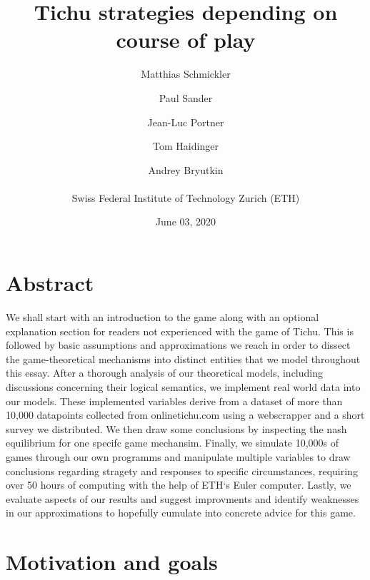 


\usepackage{multirow}
\usepackage{listings}
\usepackage{commath}
\usepackage{subcaption}
\usepackage{float}



\title{Tichu strategies depending on course of play}
\date{June 03, 2020}
\author{Matthias Schmickler \and Paul Sander \and Jean-Luc Portner \and Tom Haidinger \and Andrey Bryutkin \\ \\ Swiss Federal Institute of Technology Zurich (ETH)}
\maketitle

\section*{Abstract}
We shall start with an introduction to the game along with an optional explanation section for readers not experienced with the game of Tichu. This is followed by basic assumptions and approximations we reach in order to dissect the game-theoretical mechanisms into distinct entities that we model throughout this essay. After a thorough analysis of our theoretical models, including discussions concerning their logical semantics, we implement real world data into our models. These implemented variables derive from a dataset of more than 10,000 datapoints collected from onlinetichu.com using a webscrapper and a short survey we distributed. We then draw some conclusions by inspecting the nash equilibrium for one specifc game mechansim. Finally, we simulate 10,000s of games through our own programms and manipulate multiple variables to draw conclusions regarding stragety and responses to specific circumstances, requiring over 50 hours of computing with the help of ETH‘s Euler computer. Lastly, we evaluate aspects of our results and suggest improvments and identify weaknesses in our approximations to hopefully cumulate into concrete advice for this game.

\section{Motivation and goals}

